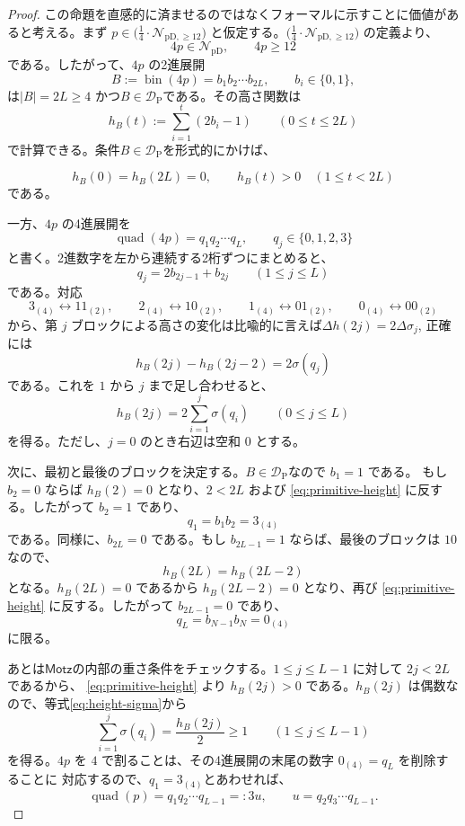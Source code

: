 \documentclass[12pt]{ltjsarticle}
\theoremstyle{plain}
\theoremstyle{definition}
\theoremstyle{plain}
\newcommand{\NpD}{\mathcal{N}_{\mathrm{pD}}}
\newcommand{\DP}{\mathcal{D}_{\mathrm{P}}}
\newcommand{\Pset}{%
  \bigl(\tfrac{1}{4}\cdot\mathcal{N}_{\mathrm{pD},\geq 12}\bigr)%
}
\begin{document}
\begin{proof}
この命題を直感的に済ませるのではなくフォーマルに示すことに価値があると考える。まず $p\in\Pset$ と仮定する。$\Pset$ の定義より、
\[
 4p\in\NpD,\qquad 4p\geq12
\]
である。したがって、$4p$ の2進展開
\[
 B:=\operatorname{bin}(4p)=b_1b_2\cdots b_{2L},
 \qquad b_i\in\{0,1\},
\]
は$|B|=2L\geq4$ かつ$B\in\DP$である。その高さ関数は
\[
 h_B(t):=\sum_{i=1}^{t}(2b_i-1)
 \qquad(0\leq t\leq2L)
\]
で計算できる。条件$B\in\DP$を形式的にかけば、 

\begin{equation}\label{eq:primitive-height}
 h_B(0)=h_B(2L)=0,
 \qquad
 h_B(t)>0\quad(1\leq t<2L)
\end{equation}
である。

一方、$4p$ の4進展開を
\[
 \operatorname{quad}(4p)=q_1q_2\cdots q_L,
 \qquad q_j\in\{0,1,2,3\}
\]
と書く。2進数字を左から連続する2桁ずつにまとめると、
\[
 q_j=2b_{2j-1}+b_{2j}
 \qquad(1\leq j\leq L)
\]
である。対応
\[
 3_{(4)}\longleftrightarrow11_{(2)},\qquad
 2_{(4)}\longleftrightarrow10_{(2)},\qquad
 1_{(4)}\longleftrightarrow01_{(2)},\qquad
 0_{(4)}\longleftrightarrow00_{(2)}
\]
から、第 $j$ ブロックによる高さの変化は比喩的に言えば$\Delta{h}({2j})=2\Delta\sigma_{j}$, 正確には
\[
 h_B(2j)-h_B(2j-2)=2\sigma(q_j)
\]
である。これを $1$ から $j$ まで足し合わせると、
\begin{equation}\label{eq:height-sigma}
 h_B(2j)=2\sum_{i=1}^{j}\sigma(q_i)
 \qquad(0\leq j\leq L)
\end{equation}
を得る。ただし、$j=0$ のとき右辺は空和 $0$ とする。

次に、最初と最後のブロックを決定する。$B\in\DP$なので $b_1=1$ である。
もし $b_2=0$ ならば $h_B(2)=0$ となり、$2<2L$ および
\eqref{eq:primitive-height} に反する。したがって $b_2=1$ であり、
\[
 q_1=b_1b_2=3_{(4)}
\]
である。同様に、$b_{2L}=0$ である。もし $b_{2L-1}=1$ ならば、最後のブロックは
$10$ なので、
\[
 h_B(2L)=h_B(2L-2)
\]
となる。$h_B(2L)=0$ であるから $h_B(2L-2)=0$ となり、再び
\eqref{eq:primitive-height} に反する。したがって $b_{2L-1}=0$ であり、
\[
 q_L=b_{N-1}b_{N}=0_{(4)}
\]
に限る。

あとは$\mathsf{Motz}$の内部の重さ条件をチェックする。$1\leq j\leq L-1$ に対して $2j<2L$ であるから、
\eqref{eq:primitive-height} より $h_B(2j)>0$ である。$h_B(2j)$ は偶数なので、等式\eqref{eq:height-sigma}から
\begin{equation}\label{eq:prefix-height}
 \sum_{i=1}^{j}\sigma(q_i)
 =\frac{h_B(2j)}{2}
 \geq1
 \qquad(1\leq j\leq L-1)
\end{equation}
を得る。$4p$ を $4$ で割ることは、その4進展開の末尾の数字 $0_{(4)}=q_{L}$ を削除することに
対応するので、$q_1=3_{(4)}$とあわせれば、
\[
 \operatorname{quad}(p)=q_1q_2\cdots q_{L-1}=:3u,
 \qquad
 u=q_2q_3\cdots q_{L-1}.
\]


\end{proof}
\end{document}
